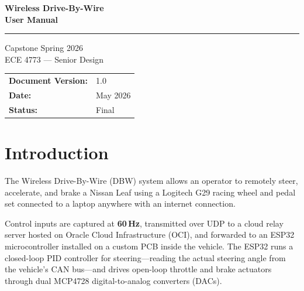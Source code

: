 ﻿\documentclass[12pt, letterpaper]{article}
\begin{document}

\begin{titlepage}
  \centering
  \vspace*{2cm}

  {\Huge\bfseries Wireless Drive-By-Wire\\[0.4em]
  \Large User Manual}

  \vspace{0.5cm}\rule{\linewidth}{0.5pt}\vspace{1cm}

  {\large Capstone Spring 2026}\\[0.4cm]
  {\normalsize ECE 4773 --- Senior Design}

  \vspace{2cm}
  \begin{tabular}{ll}
    \textbf{Document Version:} & 1.0 \\
    \textbf{Date:}             & May 2026 \\
    \textbf{Status:}           & Final \\
  \end{tabular}

\end{titlepage}

\tableofcontents
\newpage

\section{Introduction}

The Wireless Drive-By-Wire (DBW) system allows an operator to remotely steer,
accelerate, and brake a Nissan Leaf using a Logitech G29 racing wheel and pedal set
connected to a laptop anywhere with an internet connection.

Control inputs are captured at \textbf{60\,Hz}, transmitted over UDP to a cloud relay
server hosted on Oracle Cloud Infrastructure (OCI), and forwarded to an ESP32
microcontroller installed on a custom PCB inside the vehicle.  The ESP32 runs a
closed-loop PID controller for steering---reading the actual steering angle from the
vehicle's CAN bus---and drives open-loop throttle and brake actuators through dual
MCP4728 digital-to-analog converters (DACs).
\end{document}
